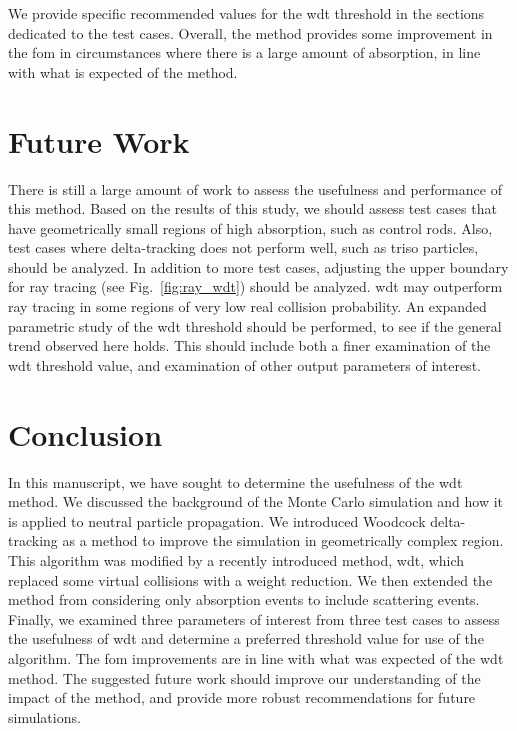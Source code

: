 We provide specific recommended values for the \gls{wdt} threshold in
the sections dedicated to the test cases. Overall, the method provides
some improvement in the \gls{fom} in circumstances where there is a
large amount of absorption, in line with what is expected of the method.

\section{Future Work}
\label{sec:future_work}

There is still a large amount of work to assess the usefulness and
performance of this method. Based on the results of this study, we
should assess test cases that have geometrically small regions of high
absorption, such as control rods. Also, test cases where
delta-tracking does not perform well, such as \gls{triso} particles,
should be analyzed. In addition to more test cases, adjusting the
upper boundary for ray tracing (see Fig.~\ref{fig:ray_wdt}) should be
analyzed. \Gls{wdt} may outperform ray tracing in some regions of very
low real collision probability. An expanded parametric study of
the \gls{wdt} threshold should be performed, to see if the general
trend observed here holds. This should include both a finer
examination of the \gls{wdt} threshold value, and examination of other
output parameters of interest.

\section{Conclusion}
\label{sec:conclusion}

In this manuscript, we have sought to determine the usefulness of the
\gls{wdt} method. We discussed the background of the Monte Carlo
simulation and how it is applied to neutral particle propagation. We
introduced Woodcock delta-tracking as a method to improve the
simulation in geometrically complex region. This algorithm was
modified by a recently introduced method, \acrlong{wdt}, which
replaced some virtual collisions with a weight reduction. We then
extended the method from considering only absorption events to include
scattering events. Finally, we examined three parameters of interest
from three test cases to assess the usefulness of \gls{wdt} and
determine a preferred threshold value for use of the algorithm. The
\gls{fom} improvements are in line with what was expected of the
\gls{wdt} method. The suggested future work should improve our
understanding of the impact of the method, and provide more robust
recommendations for future simulations.

